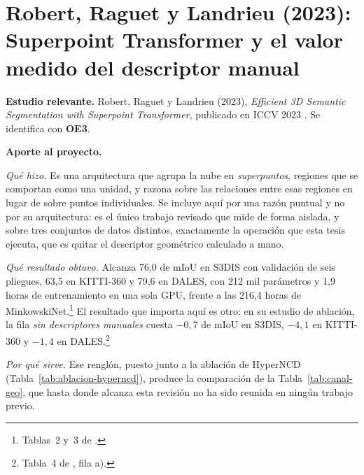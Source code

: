\section[Superpoint Transformer]{Robert, Raguet y Landrieu (2023): Superpoint
Transformer y el valor medido del descriptor manual}
\label{sec:spt}

\textbf{Estudio relevante.} Robert, Raguet y Landrieu (2023), \emph{Efficient 3D
Semantic Segmentation with Superpoint Transformer}, publicado en ICCV 2023
\cite{robert2023spt}. Se identifica con \textbf{OE3}.

\textbf{Aporte al proyecto.}

\emph{Qué hizo.} Es una arquitectura que agrupa la nube en \emph{superpuntos},
regiones que se comportan como una unidad, y razona sobre las relaciones entre
esas regiones en lugar de sobre puntos individuales. Se incluye aquí por una
razón puntual y no por su arquitectura: es el único trabajo revisado que mide de
forma aislada, y sobre tres conjuntos de datos distintos, exactamente la
operación que esta tesis ejecuta, que es quitar el descriptor geométrico
calculado a mano.

\emph{Qué resultado obtuvo.} Alcanza 76,0 de mIoU en S3DIS con validación de seis
pliegues, 63,5 en KITTI-360 y 79,6 en DALES, con 212 mil parámetros y 1,9 horas
de entrenamiento en una sola GPU, frente a las 216,4 horas de
MinkowskiNet.\footnote{Tablas~2 y~3 de \cite{robert2023spt}.} El resultado que
importa aquí es otro: en su estudio de ablación, la fila \emph{sin descriptores
manuales} cuesta $-0{,}7$ de mIoU en S3DIS, $-4{,}1$ en KITTI-360 y $-1{,}4$ en
DALES.\footnote{Tabla~4 de \cite{robert2023spt}, fila a).}

\emph{Por qué sirve.} Ese renglón, puesto junto a la ablación de HyperNCD
(Tabla~\ref{tab:ablacion-hyperncd}), produce la comparación de la
Tabla~\ref{tab:canal-geo}, que hasta donde alcanza esta revisión no ha sido
reunida en ningún trabajo previo.

